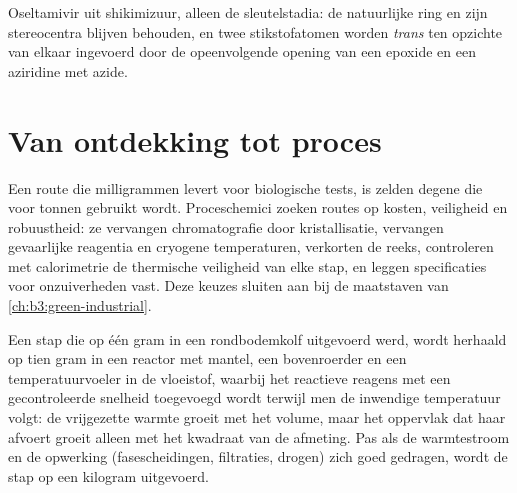 \begin{omfigure}

{\small Oseltamivir uit shikimizuur, alleen de sleutelstadia: de
natuurlijke ring en zijn stereocentra blijven behouden, en twee
stikstofatomen worden \textit{trans} ten opzichte van elkaar ingevoerd
door de opeenvolgende opening van een epoxide en een aziridine met azide.}
\end{omfigure}

\section{Van ontdekking tot proces}

Een route die milligrammen levert voor biologische tests, is zelden
degene die voor tonnen gebruikt wordt. Proceschemici zoeken routes op
kosten, veiligheid en robuustheid: ze vervangen chromatografie door
kristallisatie, vervangen gevaarlijke reagentia en cryogene
temperaturen, verkorten de reeks, controleren met calorimetrie de
thermische veiligheid van elke stap, en leggen specificaties voor
onzuiverheden vast. Deze keuzes sluiten aan bij de maatstaven van
\cref{ch:b3:green-industrial}.

\begin{inthelab}
Een stap die op één gram in een rondbodemkolf uitgevoerd werd, wordt
herhaald op tien gram in een reactor met mantel, een bovenroerder en een
temperatuurvoeler in de vloeistof, waarbij het reactieve reagens met een
gecontroleerde snelheid toegevoegd wordt terwijl men de inwendige
temperatuur volgt: de vrijgezette warmte groeit met het volume, maar het
oppervlak dat haar afvoert groeit alleen met het kwadraat van de afmeting. Pas
als de warmtestroom en de opwerking (fasescheidingen, filtraties, drogen)
zich goed gedragen, wordt de stap op een kilogram uitgevoerd.
\end{inthelab}

